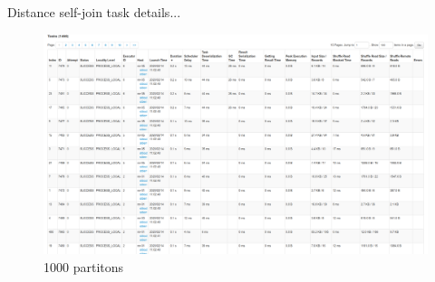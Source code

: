 \documentclass{beamer}
\begin{document}
\begin{frame}{Distance self-join task details...}
    \begin{figure}
        \includegraphics[width=\textwidth]{figures/Tasks1000}
        \caption{1000 partitons}
    \end{figure}
\end{frame}
\end{document}
